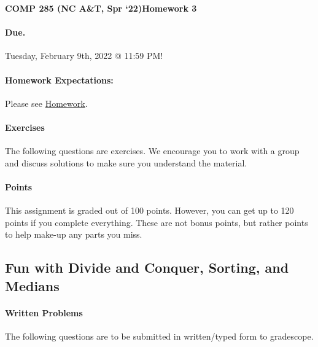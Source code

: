 \documentclass [12pt]{article}
\begin{document}
 

{\LARGE \textbf {COMP 285 (NC A\&T, Spr `22)}\hfill \textbf {Homework 3} } 
\vspace {1em} 
\begin {Instruction} 

\paragraph {Due.} Tuesday, February 9th, 2022 @ 11:59 PM!
\end {Instruction} 

\vspace {1em} 
\begin {Instruction} \paragraph {Homework Expectations:} Please see \href{https://www.comp285-fall22.ml/homework/#general-homework-information}{Homework}.
\end {Instruction}

\vspace {1em} 
\begin {Instruction} 

\paragraph {Exercises} The following questions are exercises. We encourage you to work with a group and discuss solutions to make sure you understand the material.

\paragraph {Points} This assignment is graded out of 100 points. However, you can get up to 120 points if you complete everything. These are not bonus points, but rather points to help make-up any parts you miss.

\end {Instruction} 

\begin{centering}
\section*{Fun with Divide and Conquer, Sorting, and Medians}
\end{centering}

\begin{Instruction}

\paragraph{Written Problems} The following questions are to be submitted in written/typed form to gradescope.

\end{Instruction}
\end{document}

